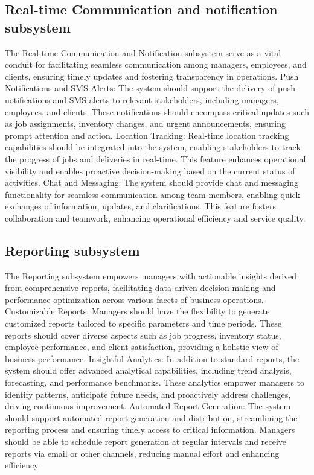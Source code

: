 \documentclass{article}
\begin{document}
	\subsection*{Real-time Communication and notification subsystem}	
	The Real-time Communication and Notification subsystem serve as a vital conduit for facilitating seamless communication among managers, employees, and clients, ensuring timely updates and fostering transparency in operations.
	Push Notifications and SMS Alerts: The system should support the delivery of push notifications and SMS alerts to relevant stakeholders, including managers, employees, and clients. These notifications should encompass critical updates such as job assignments, inventory changes, and urgent announcements, ensuring prompt attention and action.
	Location Tracking: Real-time location tracking capabilities should be integrated into the system, enabling stakeholders to track the progress of jobs and deliveries in real-time. This feature enhances operational visibility and enables proactive decision-making based on the current status of activities.
	Chat and Messaging: The system should provide chat and messaging functionality for seamless communication among team members, enabling quick exchanges of information, updates, and clarifications. This feature fosters collaboration and teamwork, enhancing operational efficiency and service quality.

	\subsection*{Reporting subsystem}	
	The Reporting subsystem empowers managers with actionable insights derived from comprehensive reports, facilitating data-driven decision-making and performance optimization across various facets of business operations.
	Customizable Reports: Managers should have the flexibility to generate customized reports tailored to specific parameters and time periods. These reports should cover diverse aspects such as job progress, inventory status, employee performance, and client satisfaction, providing a holistic view of business performance.
	Insightful Analytics: In addition to standard reports, the system should offer advanced analytical capabilities, including trend analysis, forecasting, and performance benchmarks. These analytics empower managers to identify patterns, anticipate future needs, and proactively address challenges, driving continuous improvement.
	Automated Report Generation: The system should support automated report generation and distribution, streamlining the reporting process and ensuring timely access to critical information. Managers should be able to schedule report generation at regular intervals and receive reports via email or other channels, reducing manual effort and enhancing efficiency.
\end{document}
